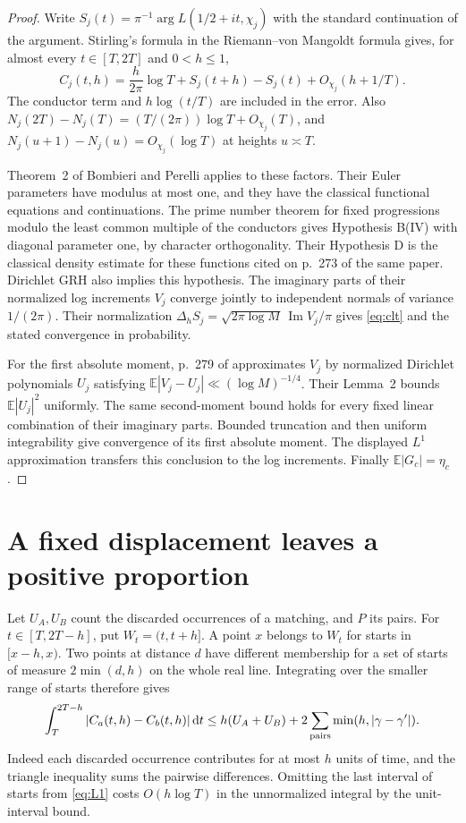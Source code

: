 \documentclass[11pt]{article}
\newcommand{\E}{\mathbb E}
\newcommand{\dd}{\,\mathrm d}
\begin{document}
\begin{proof}
Write \(S_j(t)=\pi^{-1}\arg L(1/2+it,\chi_j)\) with the standard continuation
of the argument. Stirling's formula in the Riemann--von Mangoldt formula gives,
for almost every \(t\in[T,2T]\) and \(0<h\le1\),
\[
 C_j(t,h)=\frac{h}{2\pi}\log T+S_j(t+h)-S_j(t)+O_{\chi_j}(h+1/T).
\]
The conductor term and \(h\log(t/T)\) are included in the error.
Also \(N_j(2T)-N_j(T)=(T/(2\pi))\log T+O_{\chi_j}(T)\), and
\(N_j(u+1)-N_j(u)=O_{\chi_j}(\log T)\) at heights \(u\asymp T\).

Theorem~2 of Bombieri and Perelli \cite{bp} applies to these factors.
Their Euler parameters have modulus at most one, and they have the classical
functional equations and continuations. The prime number theorem for fixed
progressions modulo the least common multiple of the conductors gives
Hypothesis B(IV) with diagonal parameter one, by character orthogonality.
Their Hypothesis D is the classical density estimate for these functions
cited on p.~273 of the same paper. Dirichlet GRH also implies this hypothesis.
The imaginary parts of their normalized log increments \(V_j\) converge jointly
to independent normals of variance \(1/(2\pi)\). Their normalization
\(\Delta_h S_j=\sqrt{2\pi\log M}\,\operatorname{Im}V_j/\pi\)
gives \eqref{eq:clt} and the stated convergence in probability.

For the first absolute moment, p.~279 of \cite{bp} approximates \(V_j\) by
normalized Dirichlet polynomials \(U_j\) satisfying
\(\E|V_j-U_j|\ll(\log M)^{-1/4}\).
Their Lemma~2 bounds \(\E|U_j|^2\) uniformly. The same second-moment
bound holds for every fixed linear combination of their imaginary parts.
Bounded truncation and then uniform integrability give convergence of its
first absolute moment. The displayed \(L^1\) approximation transfers this
conclusion to the log increments. Finally \(\E|G_c|=\eta_c\).
\end{proof}

\section{A fixed displacement leaves a positive proportion}

Let \(U_A,U_B\) count the discarded occurrences of a matching, and \(P\)
its pairs. For \(t\in[T,2T-h]\), put \(W_t=(t,t+h]\).
A point \(x\) belongs to \(W_t\) for starts in \([x-h,x)\).
Two points at distance \(d\) have different membership for a set of starts of
measure \(2\min(d,h)\) on the whole real line. Integrating over the smaller
range of starts therefore gives
\begin{equation}\label{eq:transport}
 \int_T^{2T-h}|C_a(t,h)-C_b(t,h)|\dd t
 \le h(U_A+U_B)+2\sum_{\rm pairs}\min(h,|\gamma-\gamma'|).
\end{equation}
Indeed each discarded occurrence contributes for at most \(h\) units of
time, and the triangle inequality sums the pairwise differences.
Omitting the last interval of starts from \eqref{eq:L1} costs
\(O(h\log T)\) in the unnormalized integral by the unit-interval bound.
\end{document}
